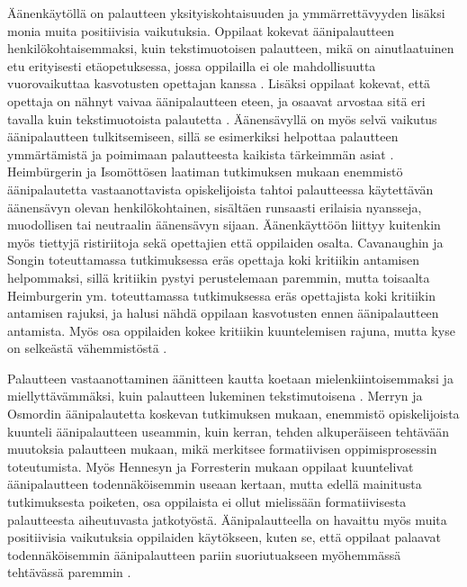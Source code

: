 \documentclass[utf8]{gradu3}
\begin{document}
Äänenkäytöllä on palautteen yksityiskohtaisuuden ja ymmärrettävyyden lisäksi monia muita positiivisia vaikutuksia. Oppilaat kokevat äänipalautteen henkilökohtaisemmaksi, kuin tekstimuotoisen palautteen, mikä on ainutlaatuinen etu erityisesti etäopetuksessa, jossa oppilailla ei ole mahdollisuutta vuorovaikuttaa kasvotusten opettajan kanssa \parencite[][]{using, distanceLearning}. Lisäksi oppilaat kokevat, että opettaja on nähnyt vaivaa äänipalautteen eteen, ja osaavat arvostaa sitä eri tavalla kuin tekstimuotoista palautetta \parencite[][]{listenOrToRead}. Äänensävyllä on myös selvä vaikutus äänipalautteen tulkitsemiseen, sillä se esimerkiksi helpottaa palautteen ymmärtämistä ja poimimaan palautteesta kaikista tärkeimmän asiat \parencite[][]{attitudes}. Heimbürgerin ja Isomöttösen \parencite[][]{moderating} laatiman tutkimuksen mukaan enemmistö äänipalautetta vastaanottavista opiskelijoista tahtoi palautteessa käytettävän äänensävyn olevan henkilökohtainen, sisältäen runsaasti erilaisia nyansseja, muodollisen tai neutraalin äänensävyn sijaan. Äänenkäyttöön liittyy kuitenkin myös tiettyjä ristiriitoja sekä opettajien että oppilaiden osalta. Cavanaughin ja Songin \parencite[][]{versus} toteuttamassa tutkimuksessa eräs opettaja koki kritiikin antamisen helpommaksi, sillä kritiikin pystyi perustelemaan paremmin, mutta toisaalta Heimburgerin ym. \parencite[][]{academics} toteuttamassa tutkimuksessa eräs opettajista koki kritiikin antamisen rajuksi, ja halusi nähdä oppilaan kasvotusten ennen äänipalautteen antamista. Myös osa oppilaiden kokee kritiikin kuuntelemisen rajuna, mutta kyse on selkeästä vähemmistöstä \parencite[][]{voice}. 

Palautteen vastaanottaminen äänitteen kautta koetaan mielenkiintoisemmaksi ja miellyttävämmäksi, kuin palautteen lukeminen tekstimutoisena \parencite[][]{listenOrToRead}. Merryn ja Osmordin \parencite[][]{attitudes} äänipalautetta koskevan tutkimuksen mukaan, enemmistö opiskelijoista kuunteli äänipalautteen useammin, kuin kerran, tehden alkuperäiseen tehtävään muutoksia palautteen mukaan, mikä merkitsee formatiivisen oppimisprosessin toteutumista. Myös Hennesyn ja Forresterin \parencite[][]{attitudes} mukaan oppilaat kuuntelivat äänipalautteen todennäköisemmin useaan kertaan, mutta edellä mainitusta tutkimuksesta poiketen, osa oppilaista ei ollut mielissään formatiivisesta palautteesta aiheutuvasta jatkotyöstä. Äänipalautteella on havaittu myös muita positiivisia vaikutuksia oppilaiden käytökseen, kuten se, että oppilaat palaavat todennäköisemmin äänipalautteen pariin suoriutuakseen myöhemmässä tehtävässä paremmin \parencite[][]{voice}.
\end{document}
